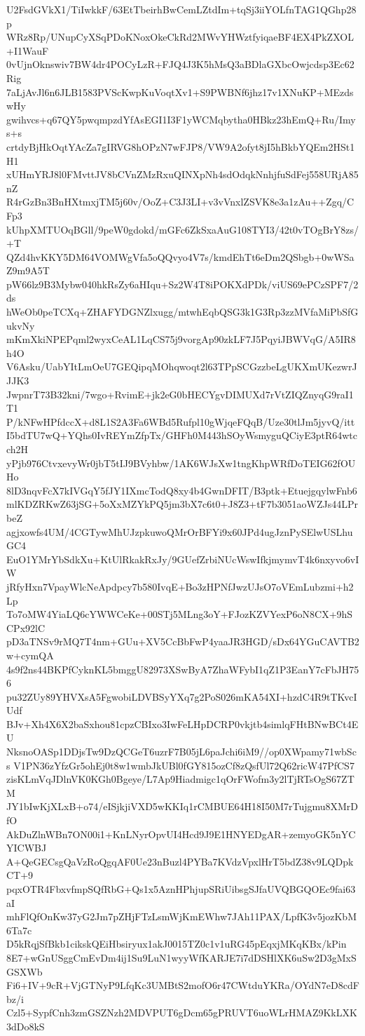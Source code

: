 U2FsdGVkX1/TiIwkkF/63EtTbeirhBwCemLZtdIm+tqSj3iiYOLfnTAG1QGhp28p
WRz8Rp/UNupCyXSqPDoKNoxOkeCkRd2MWvYHWztfyiqaeBF4EX4PkZXOL+I1WauF
0vUjnOknswiv7BW4dr4POCyLzR+FJQ4J3K5hMsQ3aBDlaGXbcOwjcdsp3Ec62Rig
7aLjAvJl6n6JLB1583PVScKwpKuVoqtXv1+S9PWBNf6jhz17v1XNuKP+MEzdswHy
gwihvcs+q67QY5pwqmpzdYfAsEGI1I3F1yWCMqbytha0HBkz23hEmQ+Ru/Imys+s
crtdyBjHkOqtYAcZa7gIRVG8hOPzN7wFJP8/VW9A2ofyt8jI5hBkbYQEm2HSt1H1
xUHmYRJ8l0FMvttJV8bCVnZMzRxuQINXpNh4sdOdqkNnhjfuSdFej558URjA85nZ
R4rGzBn3BnHXtmxjTM5j60v/OoZ+C3J3LI+v3vVnxlZSVK8e3a1zAu++Zgq/CFp3
kUhpXMTUOqBGll/9peW0gdokd/mGFc6ZkSxaAuG108TYI3/42t0vTOgBrY8zs/+T
QZd4hvKKY5DM64VOMWgVfa5oQQvyo4V7s/kmdEhTt6eDm2QSbgb+0wWSaZ9m9A5T
pW66lz9B3Mybw040hkRsZy6aHIqu+Sz2W4T8iPOKXdPDk/viUS69ePCzSPF7/2ds
hWeOb0peTCXq+ZHAFYDGNZlxugg/mtwhEqbQSG3k1G3Rp3zzMVfaMiPbSfGukvNy
mKmXkiNPEPqml2wyxCeAL1LqCS75j9vorgAp90zkLF7J5PqyiJBWVqG/A5IR8h4O
V6Asku/UabYItLmOeU7GEQipqMOhqwoqt2l63TPpSCGzzbeLgUKXmUKezwrJJJK3
JwpnrT73B32kni/7wgo+RvimE+jk2eG0bHECYgvDIMUXd7rVtZIQZnyqG9raI1T1
P/kNFwHPfdccX+d8L1S2A3Fa6WBd5Rufpl10gWjqeFQqB/Uze30tlJm5jyvQ/itt
I5bdTU7wQ+YQhs0IvREYmZfpTx/GHFh0M443hSOyWsmyguQCiyE3ptR64wtcch2H
yPjb976CtvxevyWr0jbT5tIJ9BVyhbw/1AK6WJsXw1tngKhpWRfDoTEIG62fOUHo
8lD3nqvFcX7kIVGqY5fJY1IXmcTodQ8xy4b4GwnDFIT/B3ptk+EtuejgqylwFnb6
mlKDZRKwZ63jSG+5oXxMZYkPQ5jm3bX7c6t0+J8Z3+tF7b3051aoWZJs44LPrbeZ
agjxowfs4UM/4CGTywMhUJzpkuwoQMrOrBFYi9x60JPd4ugJznPySElwUSLhuGC4
EuO1YMrYbSdkXu+KtUlRkakRxJy/9GUefZrbiNUcWswIfkjmymvT4k6nxyvo6vIW
jRfyHxn7VpayWlcNeApdpcy7b580IvqE+Bo3zHPNfJwzUJsO7oVEmLubzmi+h2Lp
To7oMW4YiaLQ6cYWWCeKe+00STj5MLng3oY+FJozKZVYexP6oN8CX+9hSCPx92lC
pD3aTNSv9rMQ7T4nm+GUu+XV5CcBbFwP4yaaJR3HGD/sDx64YGuCAVTB2w+cymQA
4s9f2ns44BKPfCyknKL5bmggU82973XSwByA7ZhaWFybI1qZ1P3EanY7cFbJH756
pu32ZUy89YHVXsA5FgwobiLDVBSyYXq7g2PoS026mKA54XI+hzdC4R9tTKvcIUdf
BJv+Xh4X6X2baSxhou81cpzCBIxo3IwFeLHpDCRP0vkjtb4simlqFHtBNwBCt4EU
NksnoOASp1DDjsTw9DzQCGeT6uzrF7B05jL6paJchi6iM9//op0XWpamy71wbScs
V1PN36zYfzGr5ohEj0t8w1wmbJkUBl0fGY815ozCf8zQsfUl72Q62ricW47PfCS7
zisKLmVqJDlnVK0KGh0Bgeye/L7Ap9Hiadmigc1qOrFWofm3y2lTjRTsOgS67ZTM
JY1bIwKjXLxB+o74/eISjkjiVXD5wKKIq1rCMBUE64H18I50M7rTujgmu8XMrDfO
AkDuZlnWBn7ON00i1+KnLNyrOpvUI4Hcd9J9E1HNYEDgAR+zemyoGK5nYCYICWBJ
A+QeGECsgQaVzRoQgqAF0Ue23nBuzl4PYBa7KVdzVpxlHrT5bdZ38v9LQDpkCT+9
pqxOTR4FbxvfmpSQfRbG+Qs1x5AznHPhjupSRiUibsgSJfaUVQBGQOEc9fai63aI
mhFlQfOnKw37yG2Jm7pZHjFTzLsmWjKmEWhw7JAh11PAX/LpfK3v5jozKbM6Ta7c
D5kRqjSfBkb1cikskQEiHbsiryux1akJ0015TZ0c1v1uRG45pEqxjMKqKBx/kPin
8E7+wGnUSggCmEvDm4ij1Su9LuN1wyyWfKARJE7i7dDSHlXK6uSw2D3gMxSGSXWb
Fi6+IV+9cR+VjGTNyP9LfqKc3UMBtS2mofO6r47CWtduYKRa/OYdN7eD8cdFbz/i
Czl5+SypfCnh3zmGSZNzh2MDVPUT6gDcm65gPRUVT6uoWLrHMAZ9KkLXK3dDo8kS
